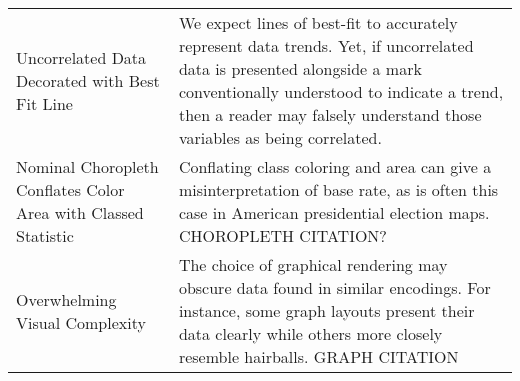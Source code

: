 \begin{longtable}{p{3cm}p{14cm}}
 \rowcolor{colorc}Uncorrelated Data Decorated with Best Fit Line  & We expect lines of best-fit to accurately represent data trends. Yet, if uncorrelated data is presented alongside a mark conventionally understood to indicate a trend, then a reader may falsely understand those variables as being correlated.   \\
 \rowcolor{colorc-opaque}Nominal Choropleth Conflates Color Area with Classed Statistic & Conflating class coloring and area can give a misinterpretation of base rate, as is often this case in American presidential election maps.  \cite{gastner2005maps} CHOROPLETH CITATION?\\
 \rowcolor{colorc}Overwhelming Visual Complexity & The choice of graphical rendering may obscure data found in similar encodings. For instance, some graph layouts present their data clearly while others more closely resemble hairballs. \cite{hofmann2012graphical} GRAPH CITATION\\


\end{longtable}
